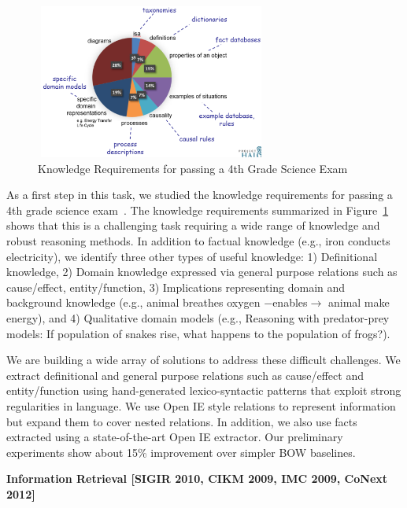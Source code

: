 \documentclass[a4paper,11pt,onecolumn]{article}
\begin{document}
\begin{figure}
	\begin{center}
	\includegraphics[width=3in,height=2in]{figures/akbc} 	
	\vspace{-2ex}
	\caption{\label{fig:akbc} {\small Knowledge Requirements for passing a 4th Grade Science Exam}}
	\vspace{-2ex}
	\end{center}
\end{figure}


As a first step in this task, we studied the knowledge requirements for passing a 4th grade science exam~\cite{clark-akbc13}. The knowledge requirements summarized in Figure~\ref{fig:akbc} shows that this is a challenging task requiring a wide range of knowledge and robust reasoning methods. In addition to factual knowledge (e.g., iron conducts electricity), we identify three other types of useful knowledge: 1) Definitional knowledge, 2) Domain knowledge expressed via general purpose relations such as cause/effect, entity/function, 3) Implications representing domain and background knowledge (e.g., animal breathes oxygen $-$enables$\rightarrow$ animal make energy), and 4) Qualitative domain models (e.g., Reasoning with predator-prey models: If population of snakes rise, what happens to the population of frogs?).

We are building a wide array of solutions to address these difficult challenges. We extract definitional and general purpose relations such as cause/effect and entity/function using hand-generated lexico-syntactic patterns that exploit strong regularities in language. We use Open IE style relations to represent information but expand them to cover nested relations. In addition, we also use facts extracted using a state-of-the-art Open IE extractor. Our preliminary experiments show about 15\% improvement over simpler BOW baselines.

{\bf Information Retrieval [SIGIR 2010, CIKM 2009, IMC 2009, CoNext 2012]}
\end{document}
